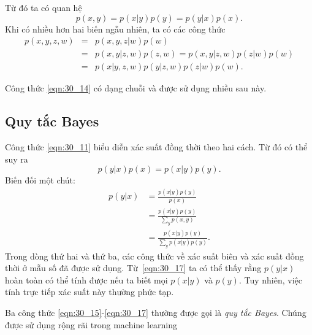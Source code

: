 Từ đó ta có quan hệ
\begin{equation}
\label{eqn:30_11}
p(x, y) = p(x|y)p(y) = p(y | x) p(x).
\end{equation}
Khi có nhiều hơn hai biến ngẫu nhiên, ta có các công thức
\begin{eqnarray}
\label{eqn:30_12}
p(x, y, z, w)
& = & p(x, y, z | w) p(w) \\
\label{eqn:30_13}
& = & p(x, y | z, w)p(z, w) = p(x, y | z, w) p(z | w) p(w) \\
\label{eqn:30_14}
& = & p(x | y, z, w)p(y | z, w) p(z | w) p(w).
\end{eqnarray}

Công thức \eqref{eqn:30_14} có dạng {chuỗi} và được sử dụng nhiều sau
này.


\subsection{Quy tắc Bayes}
Công thức \eqref{eqn:30_11} biểu diễn xác suất đồng thời theo hai cách. Từ đó có thể suy ra
\begin{equation}
p(y |x) p(x) = p(x | y) p(y).
\end{equation}
Biến đối một chút:
\begin{align}
\label{eqn:30_15}
p(y | x)
& =  \frac{p(x |y) p(y)}{p(x)} \\
\label{eqn:30_16}
& =  \frac{p(x |y) p(y)}{\sum \limits_{y} p(x, y)} \\
\label{eqn:30_17}
& =  \frac{p(x |y) p(y)}{\sum \limits_{y} p(x | y) p(y)}.
\end{align}
Trong dòng thứ hai và thứ ba, các công thức về xác suất biên và xác suất đồng thời
ở mẫu số đã được sử dụng. Từ~\eqref{eqn:30_17} ta có thể thấy rằng $p(y | x)$
hoàn toàn có thể tính được nếu ta biết mọi $p(x | y)$ và $p(y)$. Tuy nhiên, việc
tính trực tiếp xác suất này thường phức tạp.


{Ba công thức \eqref{eqn:30_15}-\eqref{eqn:30_17} thường được gọi là \textit{quy
tắc Bayes}. Chúng được sử dụng rộng rãi trong machine learning}

